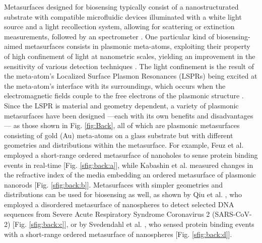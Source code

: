 Metasurfaces designed for biosensing typically consist of a nanostructurated substrate with compatible microfluidic devices illuminated with a white light source and a light recollection system, allowing for scattering or extinction measurements, followed by an spectrometer \cite{estevez_trends_2014,feuz_improving_2010}. One particular kind of  biosensing-aimed metasurfaces consists in plasmonic meta-atoms, exploiting their property of high confinement of light at nanometric scales, yielding an improvement in the sensitivity of various detection techniques \cite{khan_optical_2022}. The light confinement is the result of the meta-atom's Localized Surface Plasmon Resonances (LSPRs) being excited at the meta-atom's interface with its surroundings, which occurs when the electromagnetic fields couple to the free electrons of the plasmonic structure \cite{chen_review_2016,kim_plasmonic_2019,estevez_trends_2014}.  Since the LSPR is material and geometry dependent, a variety of plasmonic metasurfaces have been designed \cite{feuz_improving_2010,kabashin_plasmonic_2009,qiu_dual_2020,svedendahl_refractometric_2014} ---each with its own benefits and disadvantages \cite{chen_review_2016,estevez_trends_2014}--- as those shown in  Fig. \ref{fig:Back}, all of which are plasmonic metasurfaces consisting of gold (Au) meta-atoms on a glass substrate but with different geometries and distributions within the metasurface.  For example, Feuz et al. \cite{feuz_improving_2010} employed a short-range ordered metasurface of nanoholes to sense protein binding events in real-time [Fig. \ref{sfig:back:a}], while  Kabashin et al. \cite{kabashin_plasmonic_2009} measured  changes in the refractive index of the media embedding an ordered metasurface of plasmonic nanorods [Fig. \ref{sfig:back:b}].  Metasurfaces with simpler geometries and distributions can be used  for biosensing as well, as shown by Qiu et al. \cite{qiu_dual_2020}, who employed a disordered metasurface of nanospheres to detect selected DNA sequences from Severe Acute Respiratory Syndrome Coronavirus 2 (SARS-CoV-2) [Fig. \ref{sfig:back:c}], or by Svedendahl et al. \cite{svedendahl_refractometric_2014}, who sensed protein binding events with a short-range ordered metasurface of nanospheres [Fig. \ref{sfig:back:d}].

